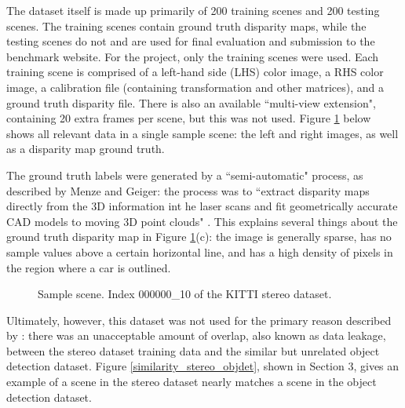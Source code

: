 The dataset itself is made up primarily of 200 training scenes and 200 testing scenes. The training scenes contain ground truth disparity maps, while the testing scenes do not and are used for final evaluation and submission to the benchmark website. For the project, only the training scenes were used. Each training scene is comprised of a left-hand side (LHS) color image, a RHS color image, a calibration file (containing transformation and other matrices), and a ground truth disparity file. There is also an available ``multi-view extension", containing 20 extra frames per scene, but this was not used. Figure \ref{stereo_sample} below shows all relevant data in a single sample scene: the left and right images, as well as a disparity map ground truth.

The ground truth labels were generated by a ``semi-automatic" process, as described by Menze and Geiger: the process was to ``extract disparity maps directly from the 3D information int he laser scans and fit geometrically accurate CAD models to moving 3D point clouds" \cite{menze_object_2015}. This explains several things about the ground truth disparity map in Figure \ref{stereo_sample}(c): the image is generally sparse, has no sample values above a certain horizontal line, and has a high density of pixels in the region where a car is outlined.

\begin{figure}[H]
    \centering
    \caption{Sample scene. Index 000000\_10 of the KITTI stereo dataset.}
    \label{stereo_sample}
\end{figure}



Ultimately, however, this dataset was not used for the primary reason described by \cite{wang_pseudo-lidar_2019}: there was an unacceptable amount of overlap, also known as data leakage, between the stereo dataset training data and the similar but unrelated object detection dataset. Figure \ref{similarity_stereo_objdet}, shown in Section 3, gives an example of a scene in the stereo dataset nearly matches a scene in the object detection dataset.

